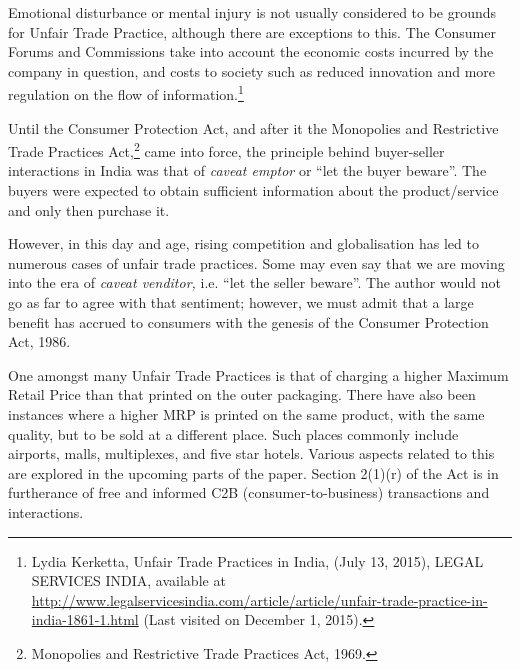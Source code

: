 \begin{multicols}{2}
\vspace{-.15cm}

\noi
Emotional disturbance or mental injury is not usually considered to be grounds for Unfair Trade
Practice, although there are exceptions to this. The Consumer Forums and Commissions take
into account the economic costs incurred by the company in question, and costs to society such
as reduced innovation and more regulation on the flow of information.\footnote{Lydia Kerketta, Unfair Trade Practices in India, (July 13, 2015), LEGAL SERVICES INDIA, available at  \url{http://www.legalservicesindia.com/article/article/unfair-trade-practice-in-india-1861-1.html} (Last visited on
December 1, 2015).}

\vspace{-.15cm}

\noi
Until the Consumer Protection Act, and after it the Monopolies and Restrictive Trade Practices Act,\footnote{Monopolies and Restrictive Trade Practices Act, 1969.} came into force, the principle behind buyer-seller interactions in India was that of \textit{caveat emptor} or “let the buyer beware”. The buyers were expected to obtain sufficient information about the product/service and only then purchase it.

\vspace{-.15cm}

\noi
However, in this day and age, rising competition and globalisation has led to numerous cases
of unfair trade practices. Some may even say that we are moving into the era of \textit{caveat venditor,}
i.e. “let the seller beware”. The author would not go as far to agree with that sentiment;
however, we must admit that a large benefit has accrued to consumers with the genesis of the
Consumer Protection Act, 1986.

\vspace{-.15cm}

\noi
One amongst many Unfair Trade Practices is that of charging a higher Maximum Retail Price
than that printed on the outer packaging. There have also been instances where a higher MRP
is printed on the same product, with the same quality, but to be sold at a different place. Such
places commonly include airports, malls, multiplexes, and five star hotels. Various aspects related to this are explored in the upcoming parts of the paper. Section 2(1)(r) of the Act is in
furtherance of free and informed C2B (consumer-to-business) transactions and interactions.

\vspace{-.1cm}


\end{multicols}
